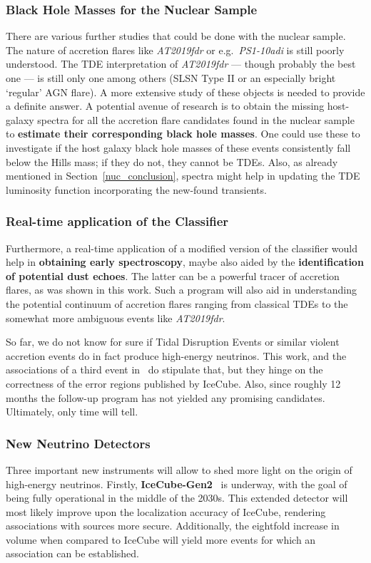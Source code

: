 \subsubsection{Black Hole Masses for the Nuclear Sample}
There are various further studies that could be done with the nuclear sample. The nature of accretion flares like \textit{AT2019fdr} or e.g.~\textit{PS1-10adi} is still poorly understood. The TDE interpretation of \textit{AT2019fdr} --- though probably the best one ---  is still only one among others (SLSN Type II or an especially bright `regular' AGN flare). A more extensive study of these objects is needed to provide a definite answer. A potential avenue of research is to obtain the missing host-galaxy spectra for all the accretion flare candidates found in the nuclear sample to \textbf{estimate their corresponding black hole masses}. One could use these to investigate if the host galaxy black hole masses of these events consistently fall below the Hills mass; if they do not, they cannot be TDEs. Also, as already mentioned in Section~\ref{nuc_conclusion}, spectra might help in updating the TDE luminosity function incorporating the new-found transients.

\subsubsection{Real-time application of the Classifier}
Furthermore, a real-time application of a modified version of the classifier would help in \textbf{obtaining early spectroscopy}, maybe also aided by the \textbf{identification of potential dust echoes}. The latter can be a powerful tracer of accretion flares, as was shown in this work. Such a program will also aid in understanding the potential continuum of accretion flares ranging from classical TDEs to the somewhat more ambiguous events like \textit{AT2019fdr}.

So far, we do not know for sure if Tidal Disruption Events or similar violent accretion events do in fact produce high-energy neutrinos. This work, and the associations of a third event in~\cite{Velzen2021} do stipulate that, but they hinge on the correctness of the error regions published by IceCube. Also, since roughly 12 months the follow-up program has not yielded any promising candidates. Ultimately, only time will tell.

\subsubsection{New Neutrino Detectors}
Three important new instruments will allow to shed more light on the origin of high-energy neutrinos. Firstly, \textbf{IceCube-Gen2}~ is underway, with the goal of being fully operational in the middle of the 2030s. This extended detector will most likely improve upon the localization accuracy of IceCube, rendering associations with sources more secure. Additionally, the eightfold increase in volume when compared to IceCube will yield more events for which an association can be established.

